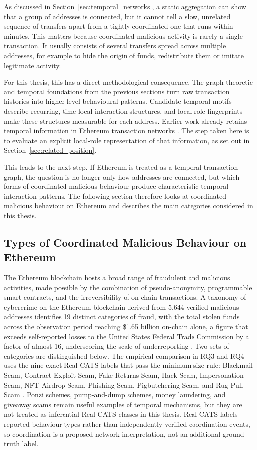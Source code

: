 \documentclass{thesisclass}
\begin{document}
As discussed in Section~\ref{sec:temporal_networks}, a static aggregation can show that a group of addresses is connected, but it cannot tell a slow, unrelated sequence of transfers apart from a tightly coordinated one that runs within minutes. This matters because coordinated malicious activity is rarely a single transaction. It usually consists of several transfers spread across multiple addresses, for example to hide the origin of funds, redistribute them or imitate legitimate activity.

For this thesis, this has a direct methodological consequence. The graph-theoretic
and temporal foundations from the previous sections turn raw transaction
histories into higher-level behavioural patterns. Candidate temporal motifs
describe recurring, time-local interaction structures, and local-role
fingerprints make these structures measurable for each address. Earlier work
already retains temporal information in Ethereum transaction networks
\citep{wu2020temporal}. The step taken here is to evaluate an explicit local-role
representation of that information, as set out in
Section~\ref{sec:related_position}.

This leads to the next step. If Ethereum is treated as a temporal transaction graph, the question is no longer only how addresses are connected, but which forms of coordinated malicious behaviour produce characteristic temporal interaction patterns. The following section therefore looks at coordinated malicious behaviour on Ethereum and describes the main categories considered in this thesis.

\subsection{Types of Coordinated Malicious Behaviour on Ethereum}
\label{sec:scam_types}
The Ethereum blockchain hosts a broad range of fraudulent and malicious activities, made possible by the combination of pseudo-anonymity, programmable smart contracts, and the irreversibility of on-chain transactions. A taxonomy of cybercrime on the Ethereum blockchain derived from 5,644 verified malicious addresses identifies 19 distinct categories of fraud, with the total stolen funds across the observation period reaching \$1.65 billion on-chain alone, a figure that exceeds self-reported losses to the United States Federal Trade Commission by a factor of almost 16, underscoring the scale of underreporting \citep{hornuf2025cybercrime}. Two sets of categories are distinguished below. The empirical comparison in RQ3 and RQ4 uses the nine exact Real-CATS labels that pass the minimum-size rule: Blackmail Scam, Contract Exploit Scam, Fake Returns Scam, Hack Scam, Impersonation Scam, NFT Airdrop Scam, Phishing Scam, Pigbutchering Scam, and Rug Pull Scam \citep{shi2025realcats}. Ponzi schemes, pump-and-dump schemes, money laundering, and giveaway scams remain useful examples of temporal mechanisms, but they are not treated as inferential Real-CATS classes in this thesis. Real-CATS labels reported behaviour types rather than independently verified coordination events, so coordination is a proposed network interpretation, not an additional ground-truth label.
\end{document}
